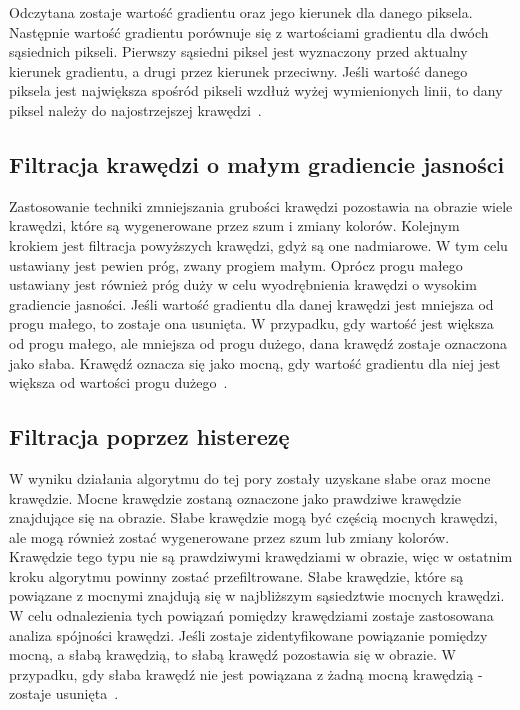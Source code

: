 \documentclass[a4paper,twoside,12pt]{book}
\begin{document}
    Odczytana zostaje wartość gradientu oraz jego kierunek dla danego piksela.
    Następnie wartość gradientu porównuje się z wartościami gradientu dla
    dwóch sąsiednich pikseli.
    Pierwszy sąsiedni piksel jest wyznaczony przed aktualny kierunek gradientu, a drugi przez kierunek przeciwny.
    Jeśli wartość danego piksela jest największa spośród pikseli wzdłuż wyżej wymienionych linii,
    to dany piksel należy do najostrzejszej krawędzi~\cite{Canny}.

    \subsection{Filtracja krawędzi o małym gradiencie jasności}\label{subsec:filtracja-krawędzi-o-małym-gradiencie-jasności}
    Zastosowanie techniki zmniejszania grubości krawędzi pozostawia na obrazie wiele krawędzi, które są wygenerowane przez szum i zmiany
    kolorów.
    Kolejnym krokiem jest filtracja powyższych krawędzi, gdyż są one nadmiarowe.
    W tym celu ustawiany jest pewien próg, zwany progiem małym.
    Oprócz progu małego ustawiany jest również próg duży w celu wyodrębnienia krawędzi o wysokim gradiencie jasności.
    Jeśli wartość gradientu dla danej krawędzi jest mniejsza od progu małego, to zostaje ona usunięta.
    W przypadku, gdy wartość jest większa od progu małego, ale mniejsza od progu dużego, dana krawędź
    zostaje oznaczona jako słaba.
    Krawędź oznacza się jako mocną, gdy wartość gradientu dla niej jest większa od wartości progu dużego~\cite{Canny}.

    \subsection{Filtracja poprzez histerezę}\label{subsec:filtracja-poprzez-histerezę}
    W wyniku działania algorytmu do tej pory zostały uzyskane słabe oraz mocne krawędzie.
    Mocne krawędzie zostaną oznaczone jako prawdziwe krawędzie znajdujące się na obrazie.
    Słabe krawędzie mogą być częścią mocnych krawędzi, ale
    mogą również zostać wygenerowane przez szum lub zmiany kolorów.
    Krawędzie tego typu nie są prawdziwymi krawędziami w obrazie, więc w ostatnim kroku algorytmu powinny zostać
    przefiltrowane.
    Słabe krawędzie, które są powiązane z mocnymi znajdują się w najbliższym sąsiedztwie mocnych krawędzi.
    W celu odnalezienia tych powiązań pomiędzy krawędziami zostaje zastosowana analiza spójności krawędzi.
    Jeśli zostaje zidentyfikowane powiązanie pomiędzy mocną, a słabą krawędzią, to słabą krawędź pozostawia się w obrazie.
    W przypadku, gdy słaba krawędź nie jest powiązana z żadną mocną krawędzią - zostaje usunięta~\cite{Canny}.
\end{document}
